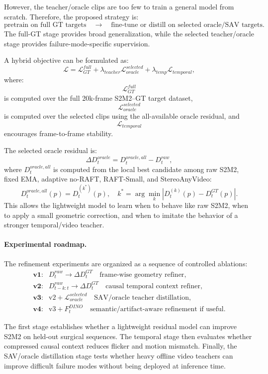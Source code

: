 \documentclass[11pt,a4paper]{article}
\begin{document}
However, the teacher/oracle clips are too few to train a general model from
scratch. Therefore, the proposed strategy is:
\[
\text{pretrain on full GT targets}
\quad \rightarrow \quad
\text{fine-tune or distill on selected oracle/SAV targets}.
\]
The full-GT stage provides broad generalization, while the selected
teacher/oracle stage provides failure-mode-specific supervision.

A hybrid objective can be formulated as:
\[
\mathcal{L}
=
\mathcal{L}_{GT}^{full}
+
\lambda_{teacher}\mathcal{L}_{oracle}^{selected}
+
\lambda_{temp}\mathcal{L}_{temporal},
\]
where:
\[
\mathcal{L}_{GT}^{full}
\]
is computed over the full 20k-frame S2M2--GT target dataset,
\[
\mathcal{L}_{oracle}^{selected}
\]
is computed over the selected clips using the all-available oracle residual,
and
\[
\mathcal{L}_{temporal}
\]
encourages frame-to-frame stability.

The selected oracle residual is:
\[
\Delta D_t^{oracle}
=
D_t^{oracle,all} - D_t^{raw},
\]
where \(D_t^{oracle,all}\) is computed from the local best candidate among raw
S2M2, fixed EMA, adaptive no-RAFT, RAFT-Small, and StereoAnyVideo:
\[
D_t^{oracle,all}(p)
=
D_t^{(k^*)}(p),
\quad
k^*
=
\arg\min_k
\left|
D_t^{(k)}(p) - D_t^{GT}(p)
\right|.
\]
This allows the lightweight model to learn when to behave like raw S2M2, when to
apply a small geometric correction, and when to imitate the behavior of a
stronger temporal/video teacher.

\paragraph{Experimental roadmap.}
The refinement experiments are organized as a sequence of controlled ablations:
\[
\begin{array}{ll}
\textbf{v1:} &
D_t^{raw} \rightarrow \Delta D_t^{GT}
\quad
\text{frame-wise geometry refiner}, \\
\textbf{v2:} &
D_{t-k:t}^{raw} \rightarrow \Delta D_t^{GT}
\quad
\text{causal temporal context refiner}, \\
\textbf{v3:} &
\text{v2} + \mathcal{L}_{oracle}^{selected}
\quad
\text{SAV/oracle teacher distillation}, \\
\textbf{v4:} &
\text{v3} + F_t^{DINO}
\quad
\text{semantic/artifact-aware refinement if useful}.
\end{array}
\]

The first stage establishes whether a lightweight residual model can improve
S2M2 on held-out surgical sequences. The temporal stage then evaluates whether
compressed causal context reduces flicker and motion mismatch. Finally, the
SAV/oracle distillation stage tests whether heavy offline video teachers can
improve difficult failure modes without being deployed at inference time.
\end{document}
